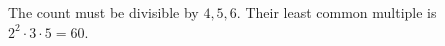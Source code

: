 The count must be divisible by $4,5,6$. Their least common multiple is $2^2\cdot3\cdot5=\boxed{60}$.

